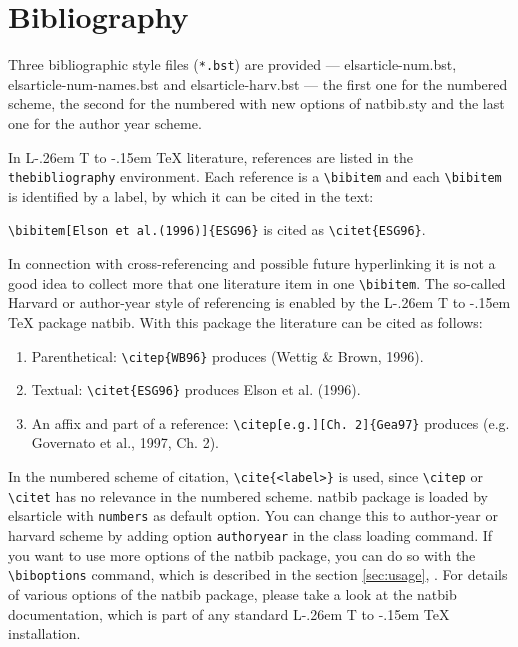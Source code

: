 \documentclass[a4paper,12pt]{article}
\makeatletter
\def\file#1{\textsf{#1}\xspace}
\DeclareRobustCommand{\LaTeX}{L\kern-.26em%
	        {\sbox\z@ T%
	         \vbox to\ht\z@{\hbox{\check@mathfonts
	           \fontsize\sf@size\z@
	           \math@fontsfalse\selectfont
	          A\,}%
	         \vss}%
	        }%
	     \kern-.15em%
	    \TeX}
\makeatother
\begin{document}
	\section{Bibliography}
	
	Three bibliographic style files (\verb+*.bst+) are provided ---
	\file{elsarticle-num.bst}, \file{elsarticle-num-names.bst} and
	\file{elsarticle-harv.bst} --- the first one for the numbered scheme, the
	second for the numbered with new options of \file{natbib.sty} and the
	last one for the author year scheme.
	
	In \LaTeX{} literature, references are listed in the
	\verb+thebibliography+ environment.  Each reference is a
	\verb+\bibitem+ and each \verb+\bibitem+ is identified by a label,
	by which it can be cited in the text:
	
	\verb+\bibitem[Elson et al.(1996)]{ESG96}+ is cited as
	\verb+\citet{ESG96}+. 
	
	\noindent In connection with cross-referencing and
	possible future hyperlinking it is not a good idea to collect
	more that one literature item in one \verb+\bibitem+.  The
	so-called Harvard or author-year style of referencing is enabled
	by the \LaTeX{} package \file{natbib}. With this package the
	literature can be cited as follows:
	
	\begin{enumerate}
	\item Parenthetical: \verb+\citep{WB96}+ produces (Wettig \& Brown, 1996).
	\item Textual: \verb+\citet{ESG96}+ produces Elson et al. (1996).
	\item An affix and part of a reference:
	\verb+\citep[e.g.][Ch. 2]{Gea97}+ produces (e.g. Governato et
	al., 1997, Ch. 2).
	\end{enumerate}
	
	In the numbered scheme of citation, \verb+\cite{<label>}+ is used,
	since \verb+\citep+ or \verb+\citet+ has no relevance in the numbered
	scheme.  \file{natbib} package is loaded by \file{elsarticle} with
	\verb+numbers+ as default option.  You can change this to author-year
	or harvard scheme by adding option \verb+authoryear+ in the class
	loading command.  If you want to use more options of the \file{natbib}
	package, you can do so with the \verb+\biboptions+ command, which is
	described in the section \ref{sec:usage}, .  For
	details of various options of the \file{natbib} package, please take a
	look at the \file{natbib} documentation, which is part of any standard
	\LaTeX{} installation.
	
\end{document}
